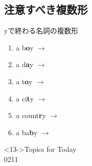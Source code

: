 \documentclass[aspectratio=169,xcolor={dvipsnames,table}]{beamer}
\newcommand{\myaudio}[1]{\href{#1}{\faVolumeUp}}
\begin{document}
\subsection{注意すべき複数形}
\begin{frame}[plain]{yで終わる名詞の複数形}\Large
\begin{enumerate}
 \item<1-> a b\textbf<14->{\textcolor<14->{YellowOrange}{o}}y $\rightarrow$ 
 \item<3-> a d\textbf<14->{\textcolor<14->{YellowOrange}{a}}y $\rightarrow$ 
 \item<5-> a t\textbf<14->{\textcolor<14->{YellowOrange}{o}}y $\rightarrow$ 
 \item<7-> a ci\textbf<14->{\textcolor<14->{CarnationPink}{t}}y $\rightarrow$ 
 \item<9-> a count\textbf<14->{\textcolor<14->{CarnationPink}{r}}y $\rightarrow$ 
 \item<11-> a ba\textbf<14->{\textcolor<14->{CarnationPink}{b}}y $\rightarrow$ 
\end{enumerate} 

\normalsize
\begin{block}<13->{Topics for Today}
\\
{\tiny 0211}\,{\scriptsize \myaudio{./audio/005_singular_plural_b.mp3}}\hfill{}
\end{block}

\end{frame}
\end{document}
